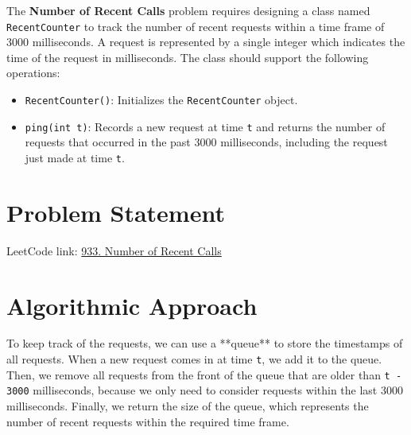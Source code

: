 
\label{problem:number_of_recent_calls}

The \textbf{Number of Recent Calls} problem requires designing a class named \texttt{RecentCounter} to track the number of recent requests within a time frame of 3000 milliseconds. A request is represented by a single integer which indicates the time of the request in milliseconds. The class should support the following operations:

\begin{itemize}
    \item \texttt{RecentCounter()}: Initializes the \texttt{RecentCounter} object.
    \item \texttt{ping(int t)}: Records a new request at time \texttt{t} and returns the number of requests that occurred in the past 3000 milliseconds, including the request just made at time \texttt{t}.
\end{itemize}

\section*{Problem Statement}
LeetCode link: \href{https://leetcode.com/problems/number-of-recent-calls/}{933. Number of Recent Calls}


\section*{Algorithmic Approach}
To keep track of the requests, we can use a **queue** to store the timestamps of all requests. When a new request comes in at time \texttt{t}, we add it to the queue. Then, we remove all requests from the front of the queue that are older than \texttt{t - 3000} milliseconds, because we only need to consider requests within the last 3000 milliseconds. Finally, we return the size of the queue, which represents the number of recent requests within the required time frame.

